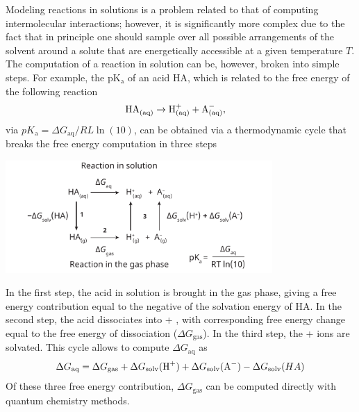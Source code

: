 \documentclass[../Main/chem371-notes.tex]{subfiles}
\begin{document}
Modeling reactions in solutions is a problem related to that of computing intermolecular interactions; however, it is significantly more complex due to the fact that in principle one should sample over all possible arrangements of the solvent around a solute that are energetically accessible at a given temperature $T$.
The computation of a reaction in solution can be, however, broken into simple steps.
For example, the pK$_\mathrm{a}$ of an acid HA, which is related to the free energy of the following reaction 
\begin{equation}
\ce{HA_{(aq)}} \rightarrow \ce{H^+_{(aq)}} + \ce{A^-_{(aq)}}, \quad 
\end{equation}
via $pK_\mathrm{a} = \Delta G_\textrm{aq} / RL \ln(10)$, can be obtained via a thermodynamic cycle  that breaks the free energy computation in three steps
\begin{center}
\includegraphics[width=4.0in]{img/solvent.pdf}
\end{center}
In the first step, the acid in solution is brought in the gas phase, giving a free energy contribution equal to the negative of the solvation energy of HA.
In the second step, the acid dissociates into  + , with corresponding free energy change equal to the free energy of dissociation ($\Delta G_\textrm{gas}$).
In the third step, the  +  ions are solvated.
This cycle allows to compute $\Delta G_\textrm{aq}$ as
\begin{equation}
\Delta G_\textrm{aq} = \Delta G_\textrm{gas} + \Delta G_\textrm{solv}(\ce{H^+}) + \Delta G_\textrm{solv}(\ce{A^-})  -\Delta G_\textrm{solv}(HA)
\end{equation}
Of these three free energy contribution, $\Delta G_\textrm{gas}$ can be computed directly with quantum chemistry methods.
\end{document}
